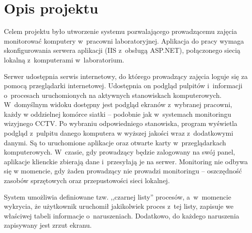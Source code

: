 \section {Opis projektu}
Celem projektu było utworzenie systemu pozwalającego prowadzącemu zajęcia monitorować komputery w~pracowni laboratoryjnej. Aplikacja do pracy wymaga skonfigurowania serwera aplikacji (IIS z~obsługą ASP.NET), połączonego siecią lokalną z~komputerami w~laboratorium. 

Serwer udostępnia serwis internetowy, do którego prowadzący zajęcia loguje się za pomocą przeglądarki internetowej. Udostępnia on podgląd pulpitów i~informacji o~procesach uruchomionych na aktywnych stanowiskach komputerowych. W~domyślnym widoku dostępny jest podgląd ekranów z~wybranej pracowni, każdy w oddzielnej komórce siatki -- podobnie jak w~systemach monitoringu wizyjnego CCTV. Po wybraniu odpowiedniego stanowiska, program wyświetla podgląd z~pulpitu danego komputera w wyższej jakości wraz z~dodatkowymi danymi. Są to uruchomione aplikacje oraz otwarte karty w~przeglądarkach komputerowych. W~czasie, gdy prowadzący będzie zalogowany na swój panel, aplikacje klienckie zbierają dane i~przesyłają je na serwer. Monitoring nie odbywa się w momencie, gdy żaden prowadzący nie prowadzi monitoringu -- oszczędność zasobów sprzętowych oraz przepustowości sieci lokalnej.

System umożliwia definiowane tzw. ,,czarnej listy'' procesów, a~w~momencie wykrycia, że użytkownik uruchomił jakikolwiek proces z~tej listy, zapisuje we właściwej tabeli informacje o~naruszeniach. Dodatkowo, do każdego naruszenia zapisywany jest zrzut ekranu.
